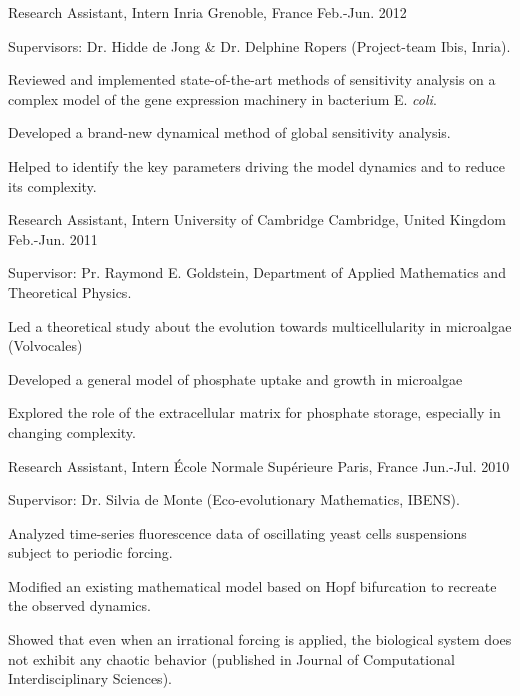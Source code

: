 
\begin{cventries}
  \cventry
    {Research Assistant, Intern} %
    {Inria} %
    {Grenoble, France} %
    {Feb.-Jun. 2012} %
    {
    Supervisors: Dr. Hidde de Jong \& Dr. Delphine Ropers (Project-team Ibis, Inria).
    \vspace{0.5cm}
	\begin{cvitems} %
		\item {Reviewed and implemented state-of-the-art methods of sensitivity analysis on a complex model of the gene expression machinery in bacterium E. \textit{coli}.}
		\item {Developed a brand-new dynamical method of global sensitivity analysis.}
		\item {Helped to identify the key parameters driving the model dynamics and to reduce its complexity.}
	\end{cvitems}
    }
    
  \cventry
    {Research Assistant, Intern} %
    {University of Cambridge} %
    {Cambridge, United Kingdom} %
    {Feb.-Jun. 2011} %
    {
	Supervisor: Pr. Raymond E. Goldstein, Department of Applied Mathematics and Theoretical Physics.
    \vspace{0.5cm}
	\begin{cvitems} %
		\item {Led a theoretical study about the evolution towards multicellularity in microalgae (Volvocales)}
		\item {Developed a general model of phosphate uptake and growth in microalgae}
		\item {Explored the role of the extracellular matrix for phosphate storage, especially in changing complexity.}
	\end{cvitems}
    }
    
  \cventry
    {Research Assistant, Intern} %
    {École Normale Supérieure} %
    {Paris, France} %
    {Jun.-Jul. 2010} %
    {
	Supervisor: Dr. Silvia de Monte (Eco-evolutionary Mathematics, IBENS).
    \vspace{0.5cm}
	\begin{cvitems} %
		\item {Analyzed time-series fluorescence data of oscillating yeast cells suspensions subject to periodic forcing.}
		\item {Modified an existing mathematical model based on Hopf bifurcation to recreate the observed dynamics.}
		\item {Showed that even when an irrational forcing is applied, the biological system does not exhibit any chaotic behavior (published in Journal of Computational Interdisciplinary Sciences).}
	\end{cvitems}
    }

\end{cventries}
